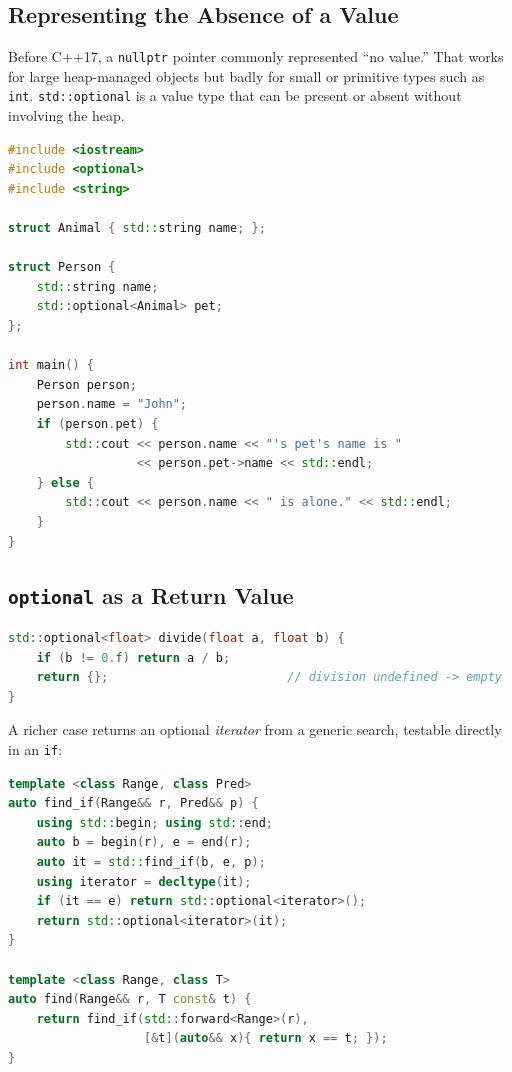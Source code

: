 \subsection{Representing the Absence of a Value}

Before C++17, a \texttt{nullptr} pointer commonly represented ``no value.'' That works for large heap-managed objects but badly for small or primitive types such as \texttt{int}. \texttt{std::optional} is a value type that can be present or absent without involving the heap.

\begin{lstlisting}[language=C++,caption={optional as an optional member}]
#include <iostream>
#include <optional>
#include <string>

struct Animal { std::string name; };

struct Person {
    std::string name;
    std::optional<Animal> pet;
};

int main() {
    Person person;
    person.name = "John";
    if (person.pet) {
        std::cout << person.name << "'s pet's name is "
                  << person.pet->name << std::endl;
    } else {
        std::cout << person.name << " is alone." << std::endl;
    }
}
\end{lstlisting}

\subsection{\texttt{optional} as a Return Value}

\begin{lstlisting}[language=C++,caption={Returning the empty optional for an undefined result}]
std::optional<float> divide(float a, float b) {
    if (b != 0.f) return a / b;
    return {};                         // division undefined -> empty
}
\end{lstlisting}

A richer case returns an optional \emph{iterator} from a generic search, testable directly in an \texttt{if}:

\begin{lstlisting}[language=C++,caption={A find that returns optional<iterator>}]
template <class Range, class Pred>
auto find_if(Range&& r, Pred&& p) {
    using std::begin; using std::end;
    auto b = begin(r), e = end(r);
    auto it = std::find_if(b, e, p);
    using iterator = decltype(it);
    if (it == e) return std::optional<iterator>();
    return std::optional<iterator>(it);
}

template <class Range, class T>
auto find(Range&& r, T const& t) {
    return find_if(std::forward<Range>(r),
                   [&t](auto&& x){ return x == t; });
}
\end{lstlisting}

